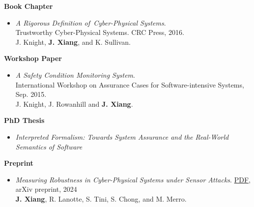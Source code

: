 \documentclass[11pt]{article}
\begin{document}
    
\textbf{Book Chapter}

\begin{itemize}
\item \textit{A Rigorous Definition of Cyber-Physical Systems}. \\
  Trustworthy Cyber-Physical Systems. CRC Press, 2016.\\
  J. Knight, \textbf{J. Xiang}, and K. Sullivan. 
\end{itemize}




\textbf{Workshop Paper}
\begin{itemize}
\item
  \textit{A Safety Condition Monitoring System}. \\
  International Workshop on Assurance Cases for Software-intensive Systems, Sep. 2015. \\
  J. Knight, J. Rowanhill and \textbf{J. Xiang}.
\end{itemize}  




\textbf{PhD Thesis}
\begin{itemize}
\item \textit{Interpreted Formalism: Towards System Assurance and the Real-World Semantics of Software}
\end{itemize}

\textbf{Preprint}
\begin{itemize}
  \item 
  \textit{Measuring Robustness in Cyber-Physical Systems under Sensor Attacks}. \href{https://arxiv.org/abs/2403.05829}{PDF}, arXiv preprint, 2024\\
  \textbf{J. Xiang}, R. Lanotte, S. Tini, S. Chong, and M. Merro. 

\end{itemize}

\end{document}
